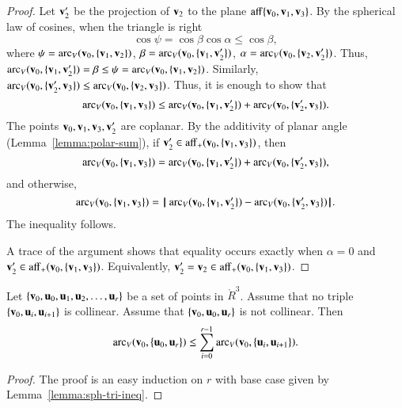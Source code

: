 \begin{proof} Let $\v_2'$ be the projection of $\v_2$ to the plane
$\op{aff}\{\v_0,\v_1,\v_3\}$.  
By the spherical law of cosines, when the triangle is right
\begin{displaymath}
\cos\psi = \cos\beta\cos\alpha \le \cos\beta,
\end{displaymath}
where $\psi = \arc_V(\v_0,\{\v_1,\v_2\})$, $\beta =
\arc_V(\v_0,\{\v_1,\v_2'\})$, $\alpha=\arc_V(\v_0,\{\v_2,\v_2'\})$.  Thus,
$\arc_V(\v_0,\{\v_1,\v_2'\})=\beta\le \psi=\arc_V(\v_0,\{\v_1,\v_2\})$.
Similarly, $\arc_V(\v_0,\{\v_2',\v_3\}) \le \arc_V(\v_0,\{\v_2,\v_3\})$.
Thus, it is enough to show that
\begin{displaymath}
  \arc_V(\v_0,\{\v_1,\v_3\}) \le \arc_V(\v_0,\{\v_1,\v_2'\}) + \arc_V(\v_0,\{\v_2',\v_3\}).
\end{displaymath}
The points $\v_0,\v_1,\v_3,\v_2'$ are coplanar.
By the additivity of planar angle (Lemma~\ref{lemma:polar-sum}), if 
$\v_2'\in \op{aff}_+(\v_0,\{\v_1,\v_3\})$, then
\begin{displaymath}
  \arc_V(\v_0,\{\v_1,\v_3\}) = \arc_V(\v_0,\{\v_1,\v_2'\}) + \arc_V(\v_0,\{\v_2',\v_3\}),   
\end{displaymath}
and otherwise,
\begin{displaymath}
  \arc_V(\v_0,\{\v_1,\v_3\}) = \norm{\arc_V(\v_0,\{\v_1,\v_2'\}) }{ \arc_V(\v_0,\{\v_2',\v_3\})}.
\end{displaymath}
The inequality follows.

A trace of the argument shows that equality occurs exactly when
$\alpha=0$ and $\v_2'\in \op{aff}_+(\v_0,\{\v_1,\v_3\})$.  Equivalently,
$\v_2'=\v_2\in\op{aff}_+(\v_0,\{\v_1,\v_3\})$.
\end{proof}

\begin{lemma}[]
\label{lemma:sph-tri-multi}
Let $\{\v_0,\u_0,\u_1,\u_2,\ldots,\u_r\}$ be a set of points in
$\ring{R}^3$.  Assume that no triple $\{\v_0,\u_i,\u_{i+1}\}$ is
collinear.  Assume that $\{\v_0,\u_0,\u_r\}$ is not collinear.  Then
\begin{displaymath}
  \arc_V(\v_0,\{\u_0,\u_r\}) \le \sum_{i=0}^{r-1} \arc_V(\v_0,\{\u_i,\u_{i+1}\}).
\end{displaymath}
\end{lemma}

\begin{proof} The proof is an easy induction on $r$ with base case given by
  Lemma~\ref{lemma:sph-tri-ineq}.
\end{proof}


